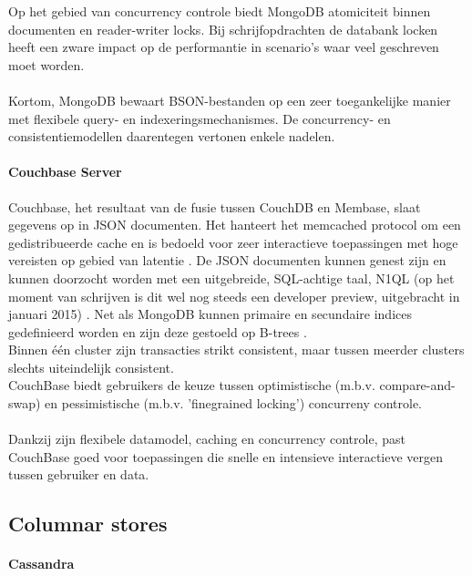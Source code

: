 Op het gebied van concurrency controle biedt MongoDB atomiciteit binnen documenten en reader-writer locks. 
Bij schrijfopdrachten de databank locken heeft een zware impact op de performantie in scenario's waar veel geschreven moet worden.\\\\
Kortom, MongoDB bewaart BSON-bestanden op een zeer toegankelijke manier met flexibele query- en indexeringsmechanismes. De concurrency- en consistentiemodellen daarentegen vertonen enkele nadelen.

\paragraph{Couchbase Server}

Couchbase, het resultaat van de fusie tussen CouchDB en Membase, slaat gegevens op in JSON documenten. Het hanteert het memcached protocol om een gedistribueerde cache en is bedoeld voor zeer interactieve toepassingen met hoge vereisten op gebied van latentie \cite{grolinger2013data}\cite{couchbase_about}.
De JSON documenten kunnen genest zijn en kunnen doorzocht worden met een uitgebreide, SQL-achtige taal, N1QL (op het moment van schrijven is dit wel nog steeds een developer preview, uitgebracht in januari 2015) \cite{couchbase_n1ql}.
Net als MongoDB kunnen primaire en secundaire indices gedefinieerd worden en zijn deze gestoeld op B-trees \cite{couchbase_index}.\\
Binnen \'e\'en cluster zijn transacties strikt consistent, maar tussen meerder clusters slechts uiteindelijk consistent.\\
CouchBase biedt gebruikers de keuze tussen optimistische (m.b.v. compare-and-swap) en pessimistische (m.b.v. 'finegrained locking') concurreny controle.\\\\
Dankzij zijn flexibele datamodel, caching en concurrency controle, past CouchBase goed voor toepassingen die snelle en intensieve interactieve vergen tussen gebruiker en data.

\subsection{Columnar stores}

\paragraph{Cassandra}

